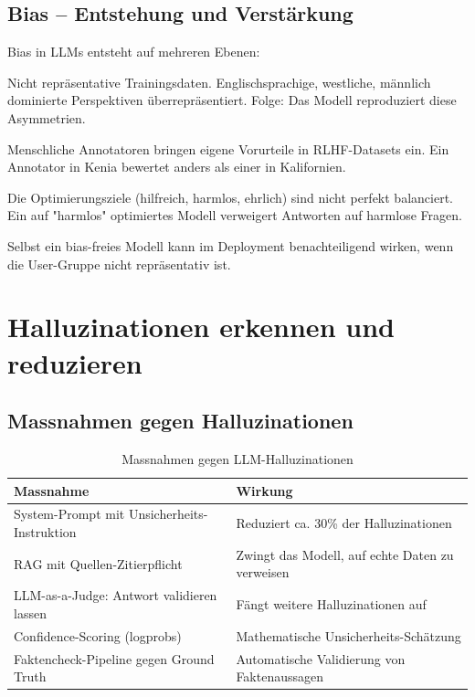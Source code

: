 \subsection{Bias -- Entstehung und Verstärkung}

Bias in LLMs entsteht auf mehreren Ebenen:

\begin{description}[leftmargin=*,style=nextline]
    \item[Data Bias] Nicht repräsentative Trainingsdaten. Englischsprachige, westliche, männlich dominierte Perspektiven überrepräsentiert. Folge: Das Modell reproduziert diese Asymmetrien.
    \item[Annotation Bias] Menschliche Annotatoren bringen eigene Vorurteile in RLHF-Datasets ein. Ein Annotator in Kenia bewertet anders als einer in Kalifornien.
    \item[Algorithmic Bias] Die Optimierungsziele (hilfreich, harmlos, ehrlich) sind nicht perfekt balanciert. Ein auf "harmlos" optimiertes Modell verweigert Antworten auf harmlose Fragen.
    \item[Deployment Bias] Selbst ein bias-freies Modell kann im Deployment benachteiligend wirken, wenn die User-Gruppe nicht repräsentativ ist.
\end{description}

\section{Halluzinationen erkennen und reduzieren}

\subsection{Massnahmen gegen Halluzinationen}

\begin{table}[H]
\centering
\begin{tabularx}{\linewidth}{lX}
\toprule
\textbf{Massnahme} & \textbf{Wirkung} \\
\midrule
System-Prompt mit Unsicherheits-Instruktion & Reduziert ca. 30\% der Halluzinationen \\
RAG mit Quellen-Zitierpflicht & Zwingt das Modell, auf echte Daten zu verweisen \\
LLM-as-a-Judge: Antwort validieren lassen & Fängt weitere Halluzinationen auf \\
Confidence-Scoring (logprobs) & Mathematische Unsicherheits-Schätzung \\
Faktencheck-Pipeline gegen Ground Truth & Automatische Validierung von Faktenaussagen \\
\bottomrule
\end{tabularx}
\caption{Massnahmen gegen LLM-Halluzinationen}
\end{table}

